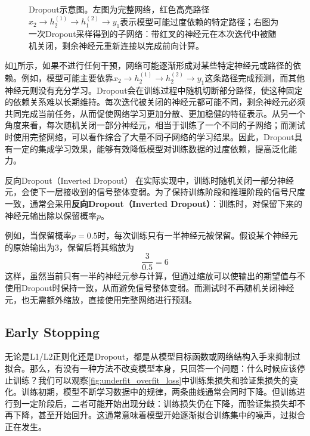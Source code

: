 \begin{figure}[H]
    \caption{Dropout示意图。左图为完整网络，红色高亮路径$x_2 \to h_2^{(1)} \to h_1^{(2)} \to y_1$表示模型可能过度依赖的特定路径；右图为一次Dropout采样得到的子网络：带红叉的神经元在本次迭代中被随机关闭，剩余神经元重新连接以完成前向计算。}
    \label{fig:dropout}
\end{figure}

如\cref{fig:dropout}所示，如果不进行任何干预，网络可能逐渐形成对某些特定神经元或路径的依赖。例如，模型可能主要依靠$x_2\to h_2^{(1)}\to h_2^{(2)}\to y_1$这条路径完成预测，而其他神经元则没有充分学习。Dropout会在训练过程中随机切断部分路径，使这种固定的依赖关系难以长期维持。每次迭代被关闭的神经元都可能不同，剩余神经元必须共同完成当前任务，从而促使网络学习更加分散、更加稳健的特征表示。从另一个角度来看，每次随机关闭一部分神经元，相当于训练了一个不同的子网络；而测试时使用完整网络，可以看作综合了大量不同子网络的学习结果。因此，Dropout具有一定的集成学习效果，能够有效降低模型对训练数据的过度依赖，提高泛化能力。

\begin{purpleBox}{反向Dropout（Inverted Dropout）}
在实际实现中，训练时随机关闭一部分神经元，会使下一层接收到的信号整体变弱。为了保持训练阶段和推理阶段的信号尺度一致，通常会采用\textbf{反向Dropout（Inverted Dropout）}：训练时，对保留下来的神经元输出除以保留概率$p$。

例如，当保留概率$p=0.5$时，每次训练只有一半神经元被保留。假设某个神经元的原始输出为$3$，保留后将其缩放为
$$
\frac{3}{0.5}=6
$$
这样，虽然当前只有一半的神经元参与计算，但通过缩放可以使输出的期望值与不使用Dropout时保持一致，从而避免信号整体变弱。而测试时不再随机关闭神经元，也无需额外缩放，直接使用完整网络进行预测。
\end{purpleBox}

\subsection{Early Stopping}

无论是L1/L2正则化还是Dropout，都是从模型目标函数或网络结构入手来抑制过拟合。那么，有没有一种方法不改变模型本身，只回答一个问题：什么时候应该停止训练？我们可以观察\cref{fig:underfit_overfit_loss}中训练集损失和验证集损失的变化。训练初期，模型不断学习数据中的规律，两条曲线通常会同时下降。但训练进行到一定阶段后，二者可能开始出现分歧：训练损失仍在下降，而验证集损失却不再下降，甚至开始回升。这通常意味着模型开始逐渐拟合训练集中的噪声，过拟合正在发生。

